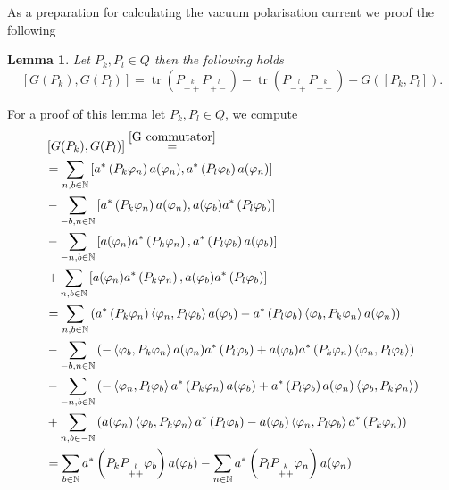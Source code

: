 \documentclass[b5paper,draft,openbib,12pt]{memoir}
\newtheorem{Lemma}[Def]{Lemma}
\DeclareMathOperator{\tr}{tr}
\begin{document}
As a preparation for calculating the vacuum polarisation current we proof the following 
\begin{Lemma}\label{G_kommutator}
Let \(P_k,P_l\in Q\) then the following holds
\begin{equation}
\left[G(P_k),G(P_l)\right]= 
\tr\left(P_{\stackrel{k}{-+}}P_{\stackrel{l}{+-}}\right)
-\tr\left(P_{\stackrel{l}{-+}}P_{\stackrel{k}{+-}}\right) 
+G\left(\left[P_k,P_l\right]\right)
.\end{equation}
\end{Lemma}
For a proof of this lemma let \(P_k,P_l \in Q\), we compute
\begin{align*}
&\left[G(P_k),G(P_l)\right]\stackrel{\eqref{G commutator}}{=}\\
&=\sum_{n,b\in\mathbb{N}} \left[ a^*\left(P_k\varphi_n\right) a(\varphi_n), a^*\left(P_l\varphi_b\right)a(\varphi_n)\right]\\
&-\sum_{-b,n\in\mathbb{N}}\left[a^*\left(P_k\varphi_n\right)a(\varphi_n), a(\varphi_b) a^*\left(P_l\varphi_b\right)\right]\\
&-\sum_{-n,b\in\mathbb{N}}\left[a(\varphi_n)a^*\left(P_k\varphi_n\right),a^*\left(P_l\varphi_b\right)a(\varphi_b)\right]\\
&+\sum_{n,b\in\mathbb{N}}\left[ a(\varphi_n)a^*\left(P_k\varphi_n\right), a(\varphi_b)a^*\left(P_l\varphi_b\right)\right]\\
&=\sum_{n,b\in\mathbb{N}} \left(a^*\left(P_k\varphi_n\right)\left<\varphi_n,P_l\varphi_b\right>a(\varphi_b)-a^*\left(P_l\varphi_b\right) \left<\varphi_b,P_k\varphi_n\right>a(\varphi_n) \right)\\
&-\sum_{-b,n\in\mathbb{N}}\left( - \left<\varphi_b,P_k \varphi_n\right>a(\varphi_n)a^*\left(P_l\varphi_b\right) + a(\varphi_b) a^*\left(P_k\varphi_n\right)\left<\varphi_n,P_l\varphi_b\right>\right)\\
&-\sum_{-n,b\in\mathbb{N}} \left( - \left< \varphi_n,P_l\varphi_b\right> a^*\left(P_k\varphi_n\right) a(\varphi_b) + a^*\left(P_l\varphi_b\right)a(\varphi_n)\left<\varphi_b,P_k\varphi_n\right>\right)\\
&+\sum_{n,b\in -\mathbb{N}} \left(a(\varphi_n) \left< \varphi_b,P_k\varphi_n\right>a^*\left(P_l\varphi_b\right)-a(\varphi_b)\left<\varphi_n,P_l\varphi_b\right> a^*\left(P_k\varphi_n\right)\right)\\
&=\sum_{b\in\mathbb{N}} a^*\left(P_k P_{\stackrel{l}{++}}\varphi_b\right)a(\varphi_b) - \sum_{n\in\mathbb{N}}a^*\left(P_l P_{\stackrel{k}{++}}\varphi_n\right)a(\varphi_n)\\

\end{align*}
\end{document}
